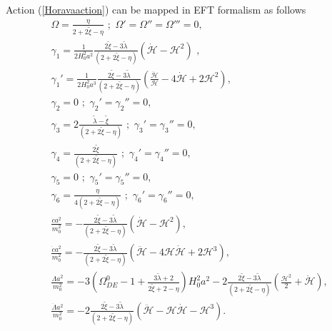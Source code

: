 \documentclass[prd,nofootinbib,showpacs]{revtex4}
\def\l{\left}
\def\r{\right}
\def\f{\frac}
\def\hub{{\mathcal H}}
\begin{document}
{Action (\ref{Horavaaction}) can be mapped in EFT formalism as follows~\cite{Frusciante:2015maa}
\begin{align}
& \Omega = \f{\eta}{2+2\tilde{\xi}-\eta} \,\,;\,\, \Omega' = \Omega'' = \Omega''' = 0, \nonumber \\
& \gamma_1 = \frac{1}{2 H_0^2a^2 }\f{ 2\tilde{\xi}-3\tilde{\lambda}}{(2+2\tilde{\xi}-\eta)}\left( \dot{\hub} -\hub^2 \right) \,\,, \nonumber\\
& \gamma_1' = \frac{1}{2 H_0^2a^3 }\f{ 2\tilde{\xi}-3\tilde{\lambda}}{(2+2\tilde{\xi}-\eta)}\left( \frac{\ddot{\hub}}{\hub} -4\dot{\hub} +2\hub^2 \right),\nonumber \\
& \gamma_2 = 0 \,\,;\,\, \gamma_2' = \gamma_2'' = 0, \nonumber \\
& \gamma_3 = 2\f{\tilde{\lambda} -\tilde{\xi}}{(2+2\tilde{\xi}-\eta)}  \,\,;\,\, \gamma_3' = \gamma_3'' = 0, \nonumber \\
& \gamma_4 = \f{2\tilde{\xi}}{(2+2\tilde{\xi}-\eta)} \,\,;\,\, \gamma_4' = \gamma_4'' = 0, \nonumber \\
& \gamma_5 = 0 \,\,;\,\, \gamma_5' = \gamma_5'' = 0, \nonumber \\
& \gamma_6 = \frac{\eta}{4(2+2\tilde{\xi}-\eta)} \,\,;\,\, \gamma_6' = \gamma_6'' = 0, \nonumber \\
& \frac{ca^2}{m_0^2} = -\f{ 2\tilde{\xi}-3\tilde{\lambda}}{(2+2\tilde{\xi}-\eta)}\left( \dot{\hub} -\hub^2 \right), \nonumber \\
& \frac{\dot{c}a^2}{m_0^2} = -\f{ 2\tilde{\xi}-3\tilde{\lambda}}{(2+2\tilde{\xi}-\eta)}\left( \ddot{\hub} -4\hub\dot{\hub} +2\hub^3 \right), \nonumber \\
& \frac{\Lambda a^2}{m_0^2} = -3\l(\Omega_{DE}^0-1+ \f{3\tilde{\lambda}+2}{2\tilde{\xi}+2-\eta}\r)H_0^2 a^2 -2\f{ 2\tilde{\xi}-3\tilde{\lambda}}{(2+2\tilde{\xi}-\eta)}\left( \frac{\hub^2}{2} +\dot{\hub} \right), \nonumber \\
& \frac{\dot{\Lambda} a^2}{m_0^2} = -2\f{ 2\tilde{\xi}-3\tilde{\lambda}}{(2+2\tilde{\xi}-\eta)} \left( \ddot{\hub} -\hub\dot{\hub} -\hub^3 \right).
\end{align}
%

}
\end{document}

